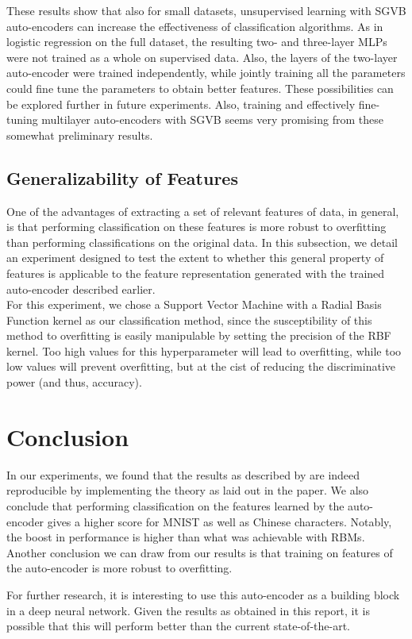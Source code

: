 \documentclass{article}
\begin{document}
These results show that also for small datasets, unsupervised learning with SGVB auto-encoders can increase the effectiveness of classification algorithms. As in logistic regression on the full dataset, the resulting two- and three-layer MLPs were not trained as a whole on supervised data. Also, the layers of the two-layer auto-encoder were trained independently, while jointly training all the parameters could fine tune the parameters to obtain better features. These possibilities can be explored further in future experiments. Also, training and effectively fine-tuning multilayer auto-encoders with SGVB seems very promising from these somewhat preliminary results. 

\subsection{Generalizability of Features}

One of the advantages of extracting a set of relevant features of data, in general, is that performing classification on these features is more robust to overfitting than performing classifications on the original data.  In this subsection, we detail an experiment designed to test the extent to whether this general property of features is applicable to the feature representation generated with the trained auto-encoder described earlier.\\
For this experiment, we chose a Support Vector Machine with a Radial Basis Function kernel as our classification method, since the susceptibility of this method to overfitting is easily manipulable by setting the precision of the RBF kernel. Too high values for this hyperparameter will lead to overfitting, while too low values will prevent overfitting, but at the cist of reducing the discriminative power (and thus, accuracy).\\


\section*{Conclusion}

In our experiments, we found that the results as described by \cite{kingma2013auto} are indeed reproducible by implementing the theory as laid out in the paper. We also conclude that performing classification on the features learned by the auto-encoder gives a higher score for MNIST as well as Chinese characters. Notably, the boost in performance is higher than what was achievable with RBMs. Another conclusion we can draw from our results is that training on features of the auto-encoder is more robust to overfitting. 

For further research, it is interesting to use this auto-encoder as a building block in a deep neural network. Given the results as obtained in this report, it is possible that this will perform better than the current state-of-the-art.


\pagebreak 


\end{document}
